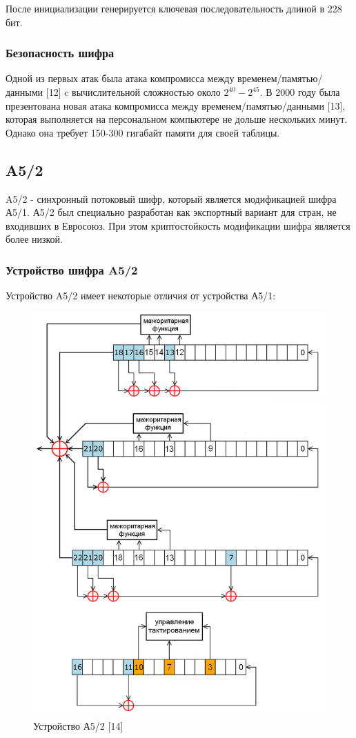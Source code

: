 \documentclass[colorthm]{./civarticle}
\begin{document}
После инициализации генерируется ключевая последовательность длиной в 228 бит.

\subsubsection{Безопасность шифра} 

Одной из первых атак была атака компромисса между временем/памятью/данными [12] c вычислительной сложностью около $2^{40}-2^{45}$. В 2000 году была презентована новая атака компромисса между временем/памятью/данными [13], которая выполняется на персональном компьютере не дольше нескольких минут. Однако она требует 150-300 гигабайт памяти для своей таблицы. 

\subsection{A5/2}

A5/2 - синхронный потоковый шифр, который является модификацией шифра А5/1. А5/2 был специально разработан как экспортный вариант для стран, не входивших в Евросоюз. При этом криптостойкость модификации шифра является более низкой.

\subsubsection{Устройство шифра A5/2}

Устройство A5/2 имеет некоторые отличия от устройства А5/1:

\begin{figure}[H]
    \centering
    \includegraphics[width=0.5\linewidth]{РСЛОСвA52.png}
    \caption{Устройство А5/2 [14]}
    \label{fig:enter-label}
\end{figure}
\end{document}
